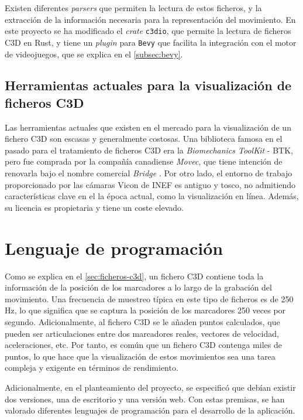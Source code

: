 Existen diferentes \textit{parsers} que permiten la lectura de estos ficheros, y la extracción de la información necesaria para la representación del movimiento. En este proyecto se ha modificado el \textit{crate} \texttt{c3dio}, que permite la lectura de ficheros \ac{C3D} en Rust, y tiene un \textit{plugin} para \texttt{Bevy} que facilita la integración con el motor de videojuegos, que se explica en el \autoref{subsec:bevy}.

\subsection{Herramientas actuales para la visualización de ficheros \acs{C3D}}

Las herramientas actuales que existen en el mercado para la visualización de un fichero \ac{C3D} son escasas y generalmente costosas. Una biblioteca famosa en el pasado para el tratamiento de ficheros \ac{C3D} era la \textit{Biomechanics ToolKit} - BTK, pero fue comprada por la compañía canadiense \textit{Movec}, que tiene intención de renovarla bajo el nombre comercial \textit{Bridge} \autocite{Bridge,ProjectBiomechanicalToolKit}. Por otro lado, el entorno de trabajo proporcionado por las cámaras Vicon de \ac{INEF} es antiguo y tosco, no admitiendo características clave en el la época actual, como la visualización en línea. Además, su licencia es propietaria y tiene un coste elevado.


\section{Lenguaje de programación}

Como se explica en el \autoref{sec:ficheros-c3d}, un fichero \ac{C3D} contiene toda la información de la posición de los marcadores a lo largo de la grabación del movimiento. Una frecuencia de muestreo típica en este tipo de ficheros es de 250 \ac{Hz}, lo que significa que se captura la posición de los marcadores 250 veces por segundo. Adicionalmente, al fichero \ac{C3D} se le añaden puntos calculados, que pueden ser articulaciones entre dos marcadores reales, vectores de velocidad, aceleraciones, etc. Por tanto, es común que un fichero \ac{C3D} contenga miles de puntos, lo que hace que la visualización de estos movimientos sea una tarea compleja y exigente en términos de rendimiento.  

Adicionalmente, en el planteamiento del proyecto, se especificó que debían existir dos versiones, una de escritorio y una versión web. Con estas premisas, se han valorado diferentes lenguajes de programación para el desarrollo de la aplicación.  


